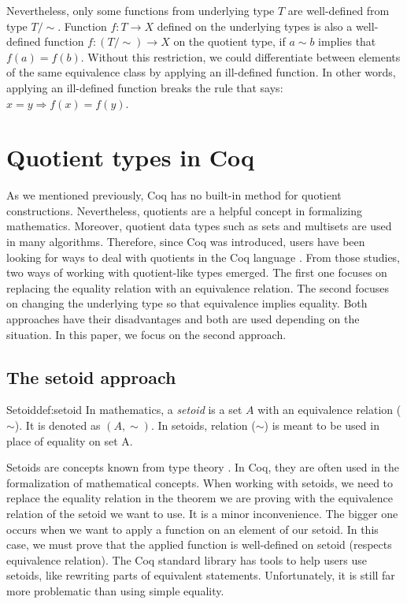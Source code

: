 Nevertheless, only some functions from underlying type $T$ are well-defined from type $T/\sim$. Function $f : T \rightarrow X$ defined on the underlying types is also a well-defined function $f : (T/\sim) \rightarrow X$ on the quotient type, if $a \sim b$ implies that $f(a) = f(b)$. Without this restriction, we could differentiate between elements of the same equivalence class by applying an ill-defined function. In other words, applying an ill-defined function breaks the rule that says: $x = y \Rightarrow f(x) = f(y)$.

\section{Quotient types in Coq}
As we mentioned previously, Coq has no built-in method for quotient constructions. Nevertheless, quotients are a helpful concept in formalizing mathematics. Moreover, quotient data types such as sets and multisets are used in many algorithms. Therefore, since Coq was introduced, users have been looking for ways to deal with quotients in the Coq language \cite{cicQuotient} \cite{PragmaticQT} \cite{NormalizedTypes}. From those studies, two ways of working with quotient-like types emerged. The first one focuses on replacing the equality relation with an equivalence relation. The second focuses on changing the underlying type so that equivalence implies equality. Both approaches have their disadvantages and both are used depending on the situation. In this paper, we focus on the second approach.

\subsection{The setoid approach}
\begin{defi}{Setoid}{def:setoid}
In mathematics, a \emph{setoid} is a set $A$ with an equivalence relation ($\sim$). It is denoted as $(A, \sim)$. In setoids, relation ($\sim$) is meant to be used in place of equality on set A.
\end{defi}
Setoids are concepts known from type theory \cite{SetoidsInTT} \cite{Setoids2}. In Coq, they are often used in the formalization of mathematical concepts. When working with setoids, we need to replace the equality relation in the theorem we are proving with the equivalence relation of the setoid we want to use. It is a minor inconvenience. The bigger one occurs when we want to apply a function on an element of our setoid. In this case, we must prove that the applied function is well-defined on setoid (respects equivalence relation). The Coq standard library has tools to help users use setoids, like rewriting parts of equivalent statements. Unfortunately, it is still far more problematic than using simple equality.

